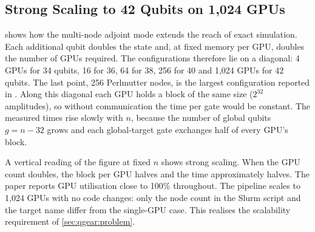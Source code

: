 \subsection{Strong Scaling to 42 Qubits on 1,024 GPUs}\label{sec:qgear:results-scaling}

 shows how the multi-node adjoint mode extends the reach of exact simulation. Each additional qubit doubles the state and, at fixed memory per GPU, doubles the number of GPUs required. The configurations therefore lie on a diagonal: 4 GPUs for 34 qubits, 16 for 36, 64 for 38, 256 for 40 and 1,024 GPUs for 42 qubits. The last point, 256 Perlmutter nodes, is the largest configuration reported in \cite{guo2025qgear}. Along this diagonal each GPU holds a block of the same size ($2^{32}$ amplitudes), so without communication the time per gate would be constant. The measured times rise slowly with $n$, because the number of global qubits $g=n-32$ grows and each global-target gate exchanges half of every GPU's block.

A vertical reading of the figure at fixed $n$ shows strong scaling. When the GPU count doubles, the block per GPU halves and the time approximately halves. The paper \cite{guo2025qgear} reports GPU utilisation close to 100\% throughout. The pipeline scales to 1,024 GPUs with no code changes: only the node count in the Slurm script and the target name differ from the single-GPU case. This realises the scalability requirement of \cref{sec:qgear:problem}.

